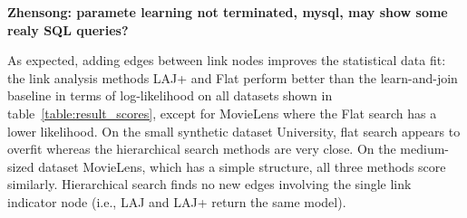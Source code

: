 \documentclass{article}
\begin{document}
\begin{table}
\begin{center}
\end{center}

\begin{center}
\end{center}
\caption{Statistical Performance of different Searching Algorithms by dataset.}
\textbf{Zhensong: paramete learning  not terminated, mysql, may show some realy SQL queries?}
\label{table:result_scores}
\end{table}


As expected, adding edges between link nodes improves the statistical data fit: 
the link analysis methods LAJ+ and Flat perform better than the learn-and-join baseline in terms of log-likelihood on all datasets shown in table~\ref{table:result_scores}, except for MovieLens where the Flat search has a lower likelihood. On the small synthetic dataset University, flat search appears to overfit whereas the hierarchical search methods are very close. On the medium-sized dataset MovieLens, which has a simple structure, all three methods score similarly. Hierarchical search finds no new edges involving the single link indicator node (i.e., LAJ and LAJ+ return the same model). 
\end{document}
